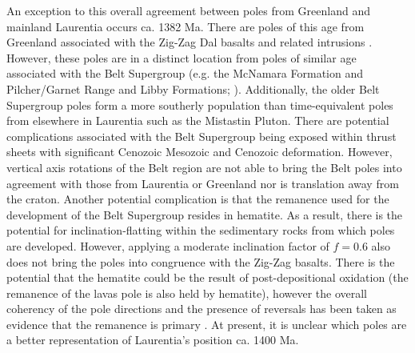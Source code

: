 \documentclass[11pt,letterpaper]{article}
\begin{document}
An exception to this overall agreement between poles from Greenland and mainland Laurentia occurs ca. 1382 Ma. There are poles of this age from Greenland associated with the Zig-Zag Dal basalts and related intrusions \citep{Marcussen1983a, Abrahamsen1987a}. However, these poles are in a distinct location from poles of similar age associated with the Belt Supergroup (e.g. the McNamara Formation and Pilcher/Garnet Range and Libby Formations; \citealp{Elston2002a}). Additionally, the older Belt Supergroup poles form a more southerly population than time-equivalent poles from elsewhere in Laurentia such as the Mistastin Pluton. There are potential complications associated with the Belt Supergroup being exposed within thrust sheets with significant Cenozoic Mesozoic and Cenozoic deformation. However, vertical axis rotations of the Belt region are not able to bring the Belt poles into agreement with those from Laurentia or Greenland nor is translation away from the craton. Another potential complication is that the remanence used for the development of the Belt Supergroup resides in hematite. As a result, there is the potential for inclination-flatting within the sedimentary rocks from which poles are developed. However, applying a moderate inclination factor of $f=0.6$ also does not bring the poles into congruence with the Zig-Zag basalts. There is the potential that the hematite could be the result of post-depositional oxidation (the remanence of the lavas pole is also held by hematite), however the overall coherency of the pole directions and the presence of reversals has been taken as evidence that the remanence is primary \citep{Elston2002a}. At present, it is unclear which poles are a better representation of Laurentia's position ca. 1400 Ma.
\end{document}
